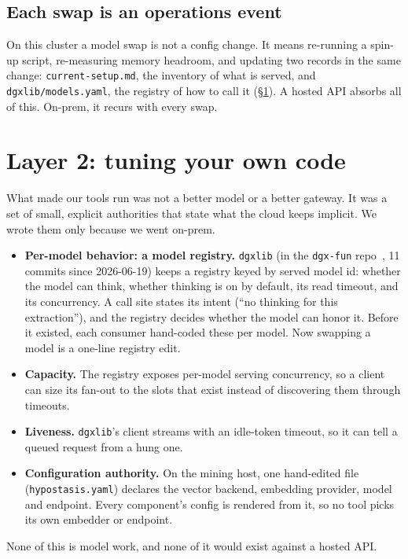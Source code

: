 \documentclass[11pt]{article}
\newcommand{\code}[1]{\texttt{#1}}
\begin{document}
\subsection{Each swap is an operations event}

On this cluster a model swap is not a config change. It means re-running a spin-up script,
re-measuring memory headroom, and updating two records in the same change: \code{current-setup.md},
the inventory of what is served, and \code{dgxlib/models.yaml}, the registry of how to call it
(\S\ref{sec:layer2}). A hosted API absorbs all of this. On-prem, it recurs with every swap.

\section{Layer 2: tuning your own code}
\label{sec:layer2}

What made our tools run was not a better model or a better gateway. It was a set of small, explicit
authorities that state what the cloud keeps implicit. We wrote them only because we went on-prem.
\begin{itemize}
  \item \textbf{Per-model behavior: a model registry.} \code{dgxlib} (in the \code{dgx-fun}
    repo~\cite{dgxfun}, 11 commits since 2026-06-19) keeps a registry keyed by served model id:
    whether the model can think, whether thinking is on by default, its read timeout, and its
    concurrency. A call site states its intent (``no thinking for this extraction''), and the
    registry decides whether the model can honor it. Before it existed, each consumer hand-coded
    these per model. Now swapping a model is a one-line registry edit.
  \item \textbf{Capacity.} The registry exposes per-model serving concurrency, so a client can size
    its fan-out to the slots that exist instead of discovering them through timeouts.
  \item \textbf{Liveness.} \code{dgxlib}'s client streams with an idle-token timeout, so it can tell
    a queued request from a hung one.
  \item \textbf{Configuration authority.} On the mining host, one hand-edited file
    (\code{hypostasis.yaml}) declares the vector backend, embedding provider, model and endpoint.
    Every component's config is rendered from it, so no tool picks its own embedder or endpoint.
\end{itemize}
None of this is model work, and none of it would exist against a hosted API.
\end{document}
